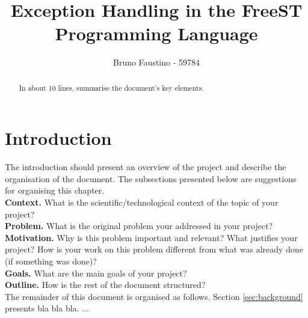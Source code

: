 \documentclass[sigplan]{acmart}
\begin{document}
\title{Exception Handling in the FreeST Programming Language} 

\author{Bruno Faustino - 59784}


\begin{abstract}
\begin{template}
  In about 10 lines, summarise the document's key elements.
\end{template}
\end{abstract}



\pagestyle{plain} %

\maketitle
\section{Introduction}

\begin{template}
  The introduction should present an overview of the project and describe the organisation of the document. The subsections presented below are suggestions for organising this chapter. \\

  \noindent\textbf{Context.} What is the scientific/technological context of the topic of your project? \\
  
  \noindent \textbf{Problem.} What is the original problem your addressed in your project?\\
  
  \noindent\textbf{Motivation.} Why is this problem important and relevant? What justifies your project? How is your work on this problem different from what was already done (if something was done)? \\
  
  \noindent\textbf{Goals.} What are the main goals of your project?\\
  
  \noindent\textbf{Outline.} How is the rest of the document structured? \\The remainder of this document is organised as follows. Section \ref{sec:background} presents bla bla bla. ...
\end{template}
\end{document}
